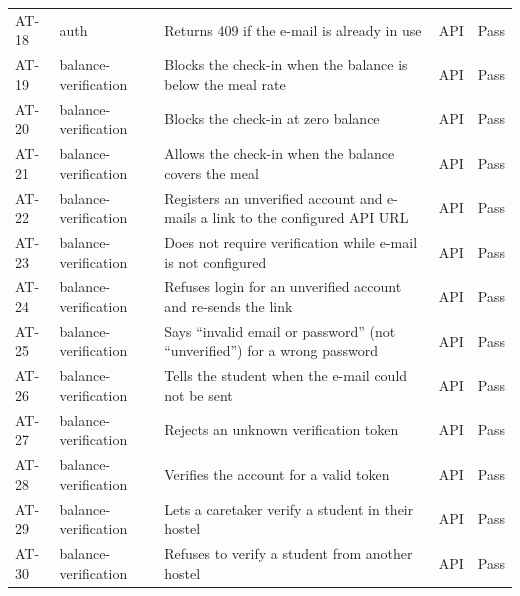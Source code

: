\documentclass[11pt,a4paper]{article}
\begin{document}
\begin{longtable}{@{}L{1.0cm}L{2.9cm}L{8.2cm}L{1.0cm}L{1.0cm}@{}}
AT-18 & auth & Returns 409 if the e-mail is already in use & API & Pass\\
AT-19 & balance-verification & Blocks the check-in when the balance is below the meal rate & API & Pass\\
AT-20 & balance-verification & Blocks the check-in at zero balance & API & Pass\\
AT-21 & balance-verification & Allows the check-in when the balance covers the meal & API & Pass\\
AT-22 & balance-verification & Registers an unverified account and e-mails a link to the configured API URL & API & Pass\\
AT-23 & balance-verification & Does not require verification while e-mail is not configured & API & Pass\\
AT-24 & balance-verification & Refuses login for an unverified account and re-sends the link & API & Pass\\
AT-25 & balance-verification & Says ``invalid email or password'' (not ``unverified'') for a wrong password & API & Pass\\
AT-26 & balance-verification & Tells the student when the e-mail could not be sent & API & Pass\\
AT-27 & balance-verification & Rejects an unknown verification token & API & Pass\\
AT-28 & balance-verification & Verifies the account for a valid token & API & Pass\\
AT-29 & balance-verification & Lets a caretaker verify a student in their hostel & API & Pass\\
AT-30 & balance-verification & Refuses to verify a student from another hostel & API & Pass\\
\end{longtable}
\end{document}
